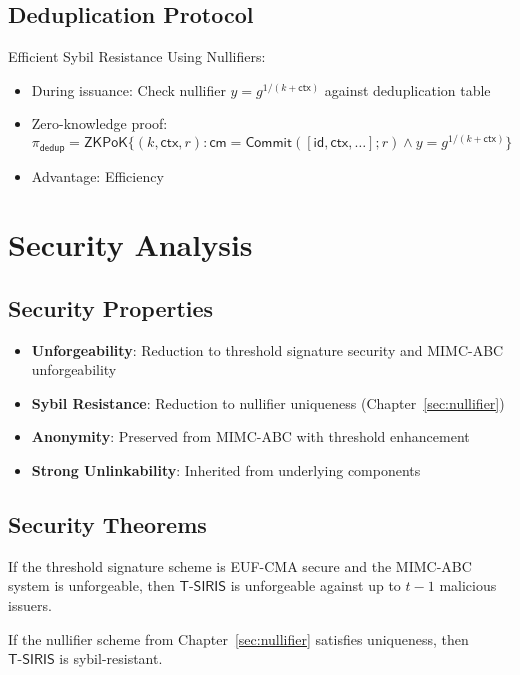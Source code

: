 \subsection{Deduplication Protocol}
Efficient Sybil Resistance Using Nullifiers:
\begin{itemize}
    \item During issuance: Check nullifier $y = g^{1/(k + \mathsf{ctx})}$ against deduplication table
    \item Zero-knowledge proof: $\pi_{\mathsf{dedup}} = \mathsf{ZKPoK}\{(k, \mathsf{ctx}, r) : \mathsf{cm} = \mathsf{Commit}([\mathsf{id}, \mathsf{ctx}, \ldots]; r) \land y = g^{1/(k + \mathsf{ctx})}\}$
    \item Advantage: Efficiency
\end{itemize}

\section{Security Analysis}
\label{sec:threshold-security}

\subsection{Security Properties}
\begin{itemize}
    \item \textbf{Unforgeability}: Reduction to threshold signature security and MIMC-ABC unforgeability
    \item \textbf{Sybil Resistance}: Reduction to nullifier uniqueness (Chapter~\ref{sec:nullifier})
    \item \textbf{Anonymity}: Preserved from MIMC-ABC with threshold enhancement
    \item \textbf{Strong Unlinkability}: Inherited from underlying components
\end{itemize}

\subsection{Security Theorems}
\begin{theorem}[Unforgeability]
If the threshold signature scheme is EUF-CMA secure and the MIMC-ABC system is unforgeable, then $\mathsf{T\text{-}SIRIS}$ is unforgeable against up to $t-1$ malicious issuers.
\end{theorem}

\begin{theorem}
If the nullifier scheme from Chapter~\ref{sec:nullifier} satisfies uniqueness, then $\mathsf{T\text{-}SIRIS}$ is sybil-resistant.
\end{theorem}

